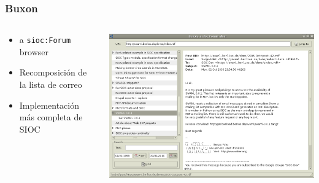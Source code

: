 \documentclass[spanish,notes=hide,16pt]{beamer}
\begin{document}
\frame
{
  \frametitle{Buxon}

  \begin{columns}
   \begin{column}{0.32\textwidth}
	\begin{itemize}
	  \item a \texttt{sioc:Forum} browser
	  \item Recomposición de la lista de correo
	  \item Implementación más completa de SIOC
	\end{itemize}
   \end{column}
   \begin{column}{0.68\textwidth}
	\includegraphics[width=\textwidth]{images/buxon.png}
   \end{column}
  \end{columns}
}
\end{document}
